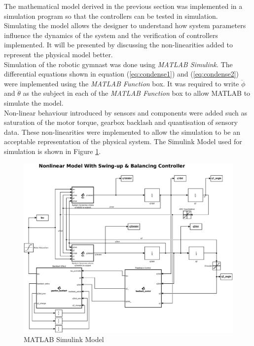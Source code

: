 The mathematical model derived in the previous section was implemented in a simulation program so that the controllers can be tested in simulation. Simulating the model allows the designer to understand how system parameters influence the dynamics of the system and the verification of controllers implemented. It will be presented by discussing the non-linearities added to represent the physical model better.\\

Simulation of the robotic gymnast was done using \textit{MATLAB Simulink}. The differential equations shown in equation (\ref{eq:condense1}) and (\ref{eq:condense2}) were implemented using the \textit{MATLAB Function} box. It was required to write $\ddot{\phi}$ and $\ddot{\theta}$ as the subject in each of the \textit{MATLAB Function} box to allow MATLAB to simulate the model.\\

Non-linear behaviour introduced by sensors and components were added such as saturation of the motor torque, gearbox backlash and quantisation of sensory data. These non-linearities were implemented to allow the simulation to be an acceptable representation of the physical system. The Simulink Model used for simulation is shown in Figure \ref{fig:sim_nonlinearfeedback}.

\begin{figure}[h]
	\centering
	\includegraphics[scale=0.3]{./figs/simulink/latex_simulink.eps}
	\caption{MATLAB Simulink Model}
	\label{fig:sim_nonlinearfeedback}
\end{figure}

